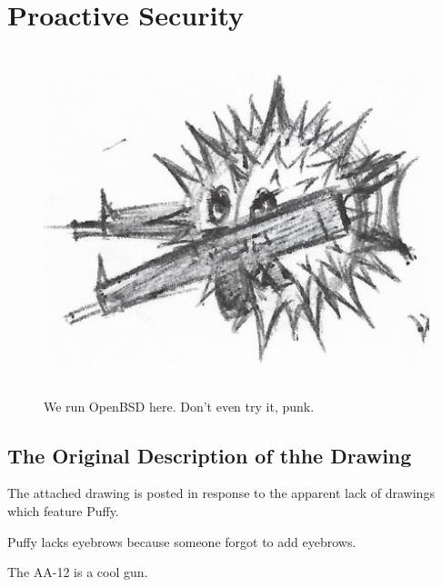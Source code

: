 \documentclass{report}
\begin{document}
\chapter{Proactive Security}
\begin{figure}[ht]
	\centering
	\includegraphics[height=10cm]{proactivesecurity/proactivesecurity.png}
	\caption[center]{We run OpenBSD here.  Don't even try it, punk.}
\end{figure}
\section{The Original Description of thhe Drawing}
The attached drawing is posted in response to the apparent lack of drawings which feature Puffy.

Puffy lacks eyebrows because someone forgot to add eyebrows.

The AA-12 is a cool gun.
\end{document}
